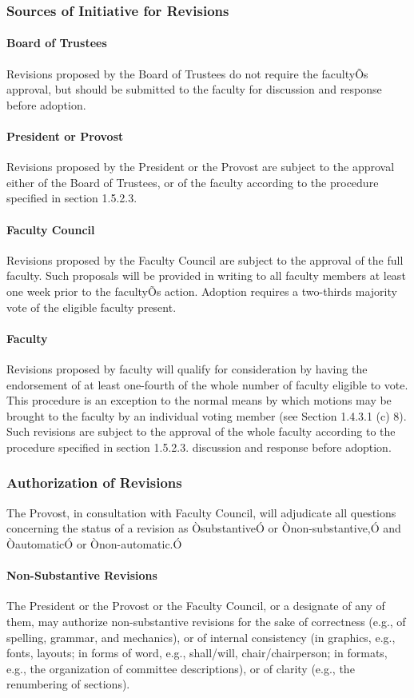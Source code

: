 \documentclass[letterpaper, 11pt]{article}
\begin{document}
		\subsubsection{Sources of Initiative for Revisions}
			\paragraph{Board of Trustees}
				Revisions proposed by the Board of Trustees do not require the facultyÕs approval, but should be submitted to the faculty for discussion and response before adoption.
			\paragraph{President or Provost}
				Revisions proposed by the President or the Provost are subject to the approval either of the Board of Trustees, or of the faculty according to the procedure specified in section 1.5.2.3.
			\paragraph{Faculty Council}
				Revisions proposed by the Faculty Council are subject to the approval of the full faculty. Such proposals will be provided in writing to all faculty members at least one week prior to the facultyÕs action. Adoption requires a two-thirds majority vote of the eligible faculty present.
			\paragraph{Faculty}
				Revisions proposed by faculty will qualify for consideration by having the endorsement of at least one-fourth of the whole number of faculty eligible to vote. This procedure is an exception to the normal means by which motions may be brought to the faculty by an individual voting member (see Section 1.4.3.1 (c) 8).  Such revisions are subject to the approval of the whole faculty according to the procedure specified in section 1.5.2.3.
				discussion and response before adoption.
		\subsubsection{Authorization of Revisions}
			The Provost, in consultation with Faculty Council, will adjudicate all questions concerning the status of a revision as ÒsubstantiveÓ or Ònon-substantive,Ó and ÒautomaticÓ or Ònon-automatic.Ó
			\paragraph{Non-Substantive Revisions}
				The President or the Provost or the Faculty Council, or a designate of any of them, may authorize non-substantive revisions for the sake of correctness (e.g., of spelling, grammar, and mechanics), or of internal consistency (in graphics, e.g., fonts, layouts; in forms of word, e.g., shall/will, chair/chairperson; in formats, e.g., the organization of committee descriptions), or of clarity (e.g., the renumbering of sections).
\end{document}
